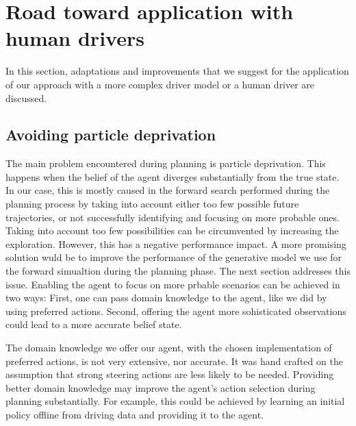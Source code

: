 






\section{Road toward application with human drivers}

In this section, adaptations and improvements that we suggest for the application of our approach with a more complex driver model or a human driver are discussed. 

\label{sec:future}
\subsection{Avoiding particle deprivation}

The main problem encountered during planning is particle deprivation. This happens when the belief of the agent diverges substantially from the true state. In our case, this is mostly caused in the forward search performed during the planning process by taking into account either too few possible future trajectories, or not successfully identifying and focusing on more probable ones. Taking into account too few possibilities can be circumvented by increasing the exploration. However, this has a negative performance impact. A more promising solution wuld be to improve the performance of the generative model we use for the forward simualtion during the planning phase. The next section addresses this issue. Enabling the agent to focus on more prbable scenarios can be achieved in two ways: First, one can pass domain knowledge to the agent, like we did by using preferred actions. Second, offering the agent more sohisticated observations could lead to a more accurate belief state.

The domain knowledge we offer our agent, with the chosen implementation of preferred actions, is not very extensive, nor accurate. It was hand crafted on the assumption that strong steering actions are less likely to be needed. Providing better domain knowledge may improve the agent's action selection during planning substantially. For example, this could be achieved by learning an initial policy offline from driving data and providing it to the agent. 

